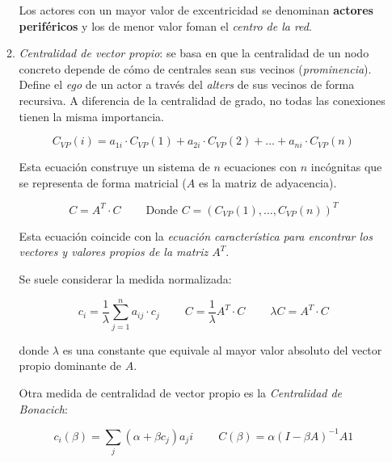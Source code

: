 \documentclass[10pt,spanish, landscape, twocolumn]{article}
\begin{document}
\begin{enumerate}[\color{tematres}{$\star$}]
\begin{enumerate}[---]
        Los actores con un mayor valor de excentricidad se denominan \textbf{\textcolor{tematres}{actores periféricos}} y los de menor valor foman el \textit{\textcolor{tematres}{centro de la red}}.

        \item \textit{\textcolor{tematres}{Centralidad de vector propio}}: se basa en que la centralidad de un nodo concreto depende de cómo de centrales sean sus vecinos (\textit{\textcolor{tematres}{prominencia}}). Define el \textit{\textcolor{tematres}{ego}} de un actor a través del \textit{\textcolor{tematres}{alters}} de sus vecinos de forma recursiva. A diferencia de la centralidad de grado, no todas las conexiones tienen la misma importancia.

        \begin{displaymath}
            C_{VP}(i) = a_{1i} \cdot C_{VP}(1) + a_{2i} \cdot C_{VP}(2) + \ldots + a_{ni} \cdot C_{VP}(n)
        \end{displaymath}

        Esta ecuación construye un sistema de $n$ ecuaciones con $n$ incógnitas que se representa de forma matricial ($A$ es la matriz de adyacencia).

        \begin{displaymath}
            C = A^T \cdot C \qquad\ \textrm{Donde $C = (C_{VP}(1),\ldots, C_{VP}(n))^T$}
        \end{displaymath}

        Esta ecuación coincide con la \textit{\textcolor{tematres}{ecuación característica para encontrar los vectores y valores propios de la matriz $A^T$}}.

        Se suele considerar la medida normalizada:

        \begin{displaymath}
            c_i = \frac{1}{\lambda} \sum_{j=1}^n a_{ij} \cdot c_j \qquad\ C = \frac{1}{\lambda} A^T \cdot C \qquad\ \lambda C = A^T \cdot C
        \end{displaymath}

        donde $\lambda$ es una constante que equivale al mayor valor absoluto del vector propio dominante de $A$.

        Otra medida de centralidad de vector propio es la \textit{\textcolor{tematres}{Centralidad de Bonacich}}:

        \begin{displaymath}
            c_i (\beta) = \sum_j (\alpha + \beta c_j) a_ji \qquad\ C(\beta) = \alpha (I - \beta A)^{-1} A1
        \end{displaymath}


\end{enumerate}
\end{enumerate}
\end{document}
